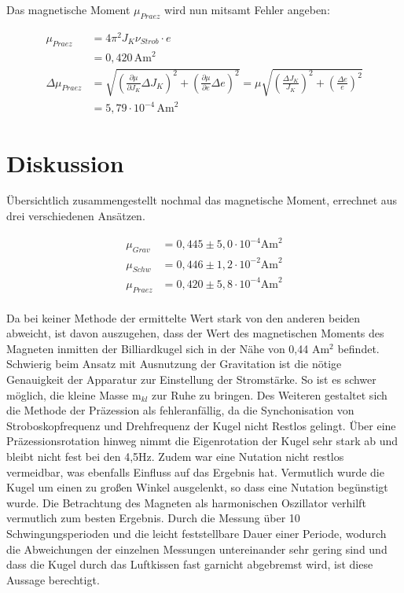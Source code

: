 Das magnetische Moment $\mu_{Praez}$ wird nun mitsamt Fehler angeben:

\begin{align}
 \nonumber
 \mu_{Praez} &= 4\pi^2 J_K \nu_{Strob} \cdot e \\
 &= 0,420\, \text{Am}^2\\
 \nonumber
 \Delta \mu_{Praez} &= \sqrt{\left(\frac{\partial \mu}{\partial J_{K}}\Delta J_{K} \right)^2 + \left(\frac{\partial \mu}{\partial e}\Delta e \right)^2} = \mu \sqrt{\left( \frac{\Delta J_{K}}{J_{K}}\right)^2 + \left( \frac{\Delta e}{e}\right)^2}\\
 &= 5,79 \cdot 10^{-4}\, \text{Am}^2
\end{align}

\section{Diskussion}
Übersichtlich zusammengestellt nochmal das magnetische Moment, errechnet aus drei verschiedenen Ansätzen.

\begin{align*}
 \mu_{Grav} &= 0,445 \pm 5,0 \cdot 10^{-4} \text{Am}^2\\
 \mu_{Schw} &= 0,446 \pm 1,2 \cdot 10^{-2} \text{Am}^2\\
 \mu_{Praez} &= 0,420 \pm 5,8 \cdot 10^{-4} \text{Am}^2\\
\end{align*}

Da bei keiner Methode der ermittelte Wert stark von den anderen beiden abweicht, ist davon auszugehen, dass der Wert des magnetischen 
Moments des Magneten inmitten der Billiardkugel sich in der Nähe von 0,44 Am$^2$ befindet. Schwierig beim Ansatz mit Ausnutzung der
Gravitation ist die nötige Genauigkeit der Apparatur zur Einstellung der Stromstärke. So ist es schwer möglich, die kleine Masse m$_{kl}$
zur Ruhe zu bringen. Des Weiteren gestaltet sich die Methode der Präzession als fehleranfällig, da die Synchonisation von Stroboskopfrequenz
und Drehfrequenz der Kugel nicht Restlos gelingt. Über eine Präzessionsrotation hinweg nimmt die Eigenrotation der Kugel sehr stark ab und bleibt nicht fest bei den 4,5Hz. Zudem war eine Nutation nicht restlos vermeidbar, was ebenfalls Einfluss auf das Ergebnis hat. 
Vermutlich wurde die Kugel um einen zu großen Winkel ausgelenkt, so dass eine Nutation begünstigt wurde. Die Betrachtung des Magneten als
harmonischen Oszillator verhilft vermutlich zum besten Ergebnis. Durch die Messung über 10 Schwingungsperioden und die leicht feststellbare Dauer
einer Periode, wodurch die Abweichungen der einzelnen Messungen untereinander sehr gering sind und dass die Kugel durch das Luftkissen fast garnicht abgebremst wird,
 ist diese Aussage berechtigt.







